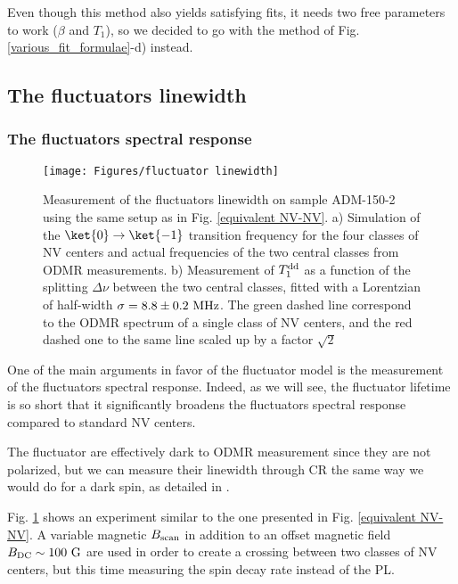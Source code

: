 \documentclass[a4paper,11pt]{report}
\begin{document}
Even though this method also yields satisfying fits, it needs two free parameters to work ($\beta$ and $T_1$), so we decided to go with the method of Fig. \ref{various_fit_formulae}-d) instead.

\subsection{The fluctuators linewidth}

\subsubsection{The fluctuators spectral response}
\begin{figure}[h]
\centering
\texttt{[image: Figures/fluctuator linewidth]}
\caption{Measurement of the fluctuators linewidth on sample ADM-150-2 using the same setup as in Fig. \ref{equivalent NV-NV}. a) Simulation of the $\ket{0} \to \ket{-1}$ transition frequency for the four classes of NV centers and actual frequencies of the two central classes from ODMR measurements. b) Measurement of $T_1^{\rm dd}$ as a function of the splitting $\Delta \nu$ between the two central classes, fitted with a Lorentzian of half-width $\sigma=8.8 \pm 0.2\ \rm MHz$. The green dashed line correspond to the ODMR spectrum of a single class of NV centers, and the red dashed one to the same line scaled up by a factor $\sqrt{2}$}
\label{fluct linewidth}
\end{figure}



One of the main arguments in favor of the fluctuator model is the measurement of the fluctuators spectral response. Indeed, as we will see, the fluctuator lifetime is so short that it significantly broadens the fluctuators spectral response compared to standard NV centers.

The fluctuator are effectively dark to ODMR measurement since they are not polarized, but we can measure their linewidth through CR the same way we would do for a dark spin, as detailed in \citep{hall2016detection}.

Fig. \ref{fluct linewidth} shows an experiment similar to the one presented in Fig. \ref{equivalent NV-NV}. A variable magnetic $B_{\rm scan}$ in addition to an offset magnetic field $B_{\rm DC} \sim 100\ \rm G$ are used in order to create a crossing between two classes of NV centers, but this time measuring the spin decay rate instead of the PL.
\end{document}
